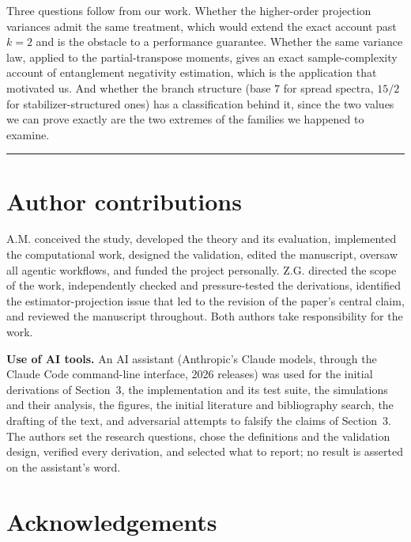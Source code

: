 \documentclass[a4paper,superscriptaddress,nofootinbib,onecolumn,nopdfoutputerror]{quantumarticle}
\begin{document}
Three questions follow from our work. Whether the higher-order projection variances admit the same
treatment,
which would extend the exact account past \(k = 2\) and is the obstacle to a performance
guarantee. Whether the same variance law, applied to the partial-transpose moments, gives an exact
sample-complexity account of entanglement negativity estimation, which is the application that
motivated us. And whether the branch structure (base \(7\) for spread spectra, \(15/2\) for
stabilizer-structured ones) has a classification behind it, since the two values we can prove
exactly are the two extremes of the families we happened to examine.

\begin{center}\rule{0.5\linewidth}{0.5pt}\end{center}

\hypertarget{author-contributions}{%
\section*{Author contributions}\label{author-contributions}}

A.M. conceived the study, developed the theory and its evaluation, implemented the
computational work, designed the validation, edited the manuscript, oversaw all agentic
workflows, and funded the project personally. Z.G. directed the scope of the work,
independently checked and
pressure-tested the derivations, identified the estimator-projection issue that led to
the revision of the paper's central claim, and reviewed the manuscript throughout.
Both authors take responsibility for the work.

\textbf{Use of AI tools.} An AI assistant (Anthropic's Claude models, through the Claude Code
command-line interface, 2026 releases) was used for the initial derivations of Section~3, the
implementation and its test suite, the simulations and their analysis, the figures, the
initial literature and bibliography search, the drafting of the text, and adversarial
attempts to falsify the claims of Section~3. The authors set the research questions, chose
the definitions and the validation design, verified every derivation, and selected what to
report; no result is asserted on the assistant's word.

\hypertarget{acknowledgements}{%
\section*{Acknowledgements}\label{acknowledgements}}
\end{document}
